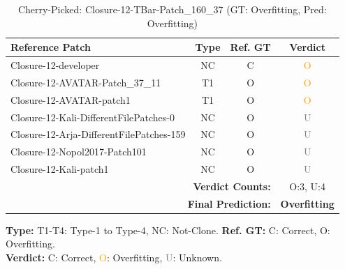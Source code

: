 \begin{table}[t]
\centering
\caption{Cherry-Picked: Closure-12-TBar-Patch\_160\_37 (GT: Overfitting, Pred: Overfitting)}
\label{tab:cherry-Closure12TBarPatch16037}
\footnotesize
\renewcommand{\arraystretch}{1.1}
\setlength{\tabcolsep}{4pt}
\begin{tabular}{l|c|c|c}
\hline
\textbf{Reference Patch} & \textbf{Type} & \textbf{Ref. GT} & \textbf{Verdict} \\
\hline
Closure-12-developer & NC & C & \textcolor{orange}{O} \\
Closure-12-AVATAR-Patch\_37\_11 & T1 & O & \textcolor{orange}{O} \\
Closure-12-AVATAR-patch1 & T1 & O & \textcolor{orange}{O} \\
Closure-12-Kali-DifferentFilePatches-0 & NC & O & \textcolor{gray}{U} \\
Closure-12-Arja-DifferentFilePatches-159 & NC & O & \textcolor{gray}{U} \\
Closure-12-Nopol2017-Patch101 & NC & O & \textcolor{gray}{U} \\
Closure-12-Kali-patch1 & NC & O & \textcolor{gray}{U} \\
\hline
\multicolumn{3}{r|}{\textbf{Verdict Counts:}} & O:3, U:4 \\
\multicolumn{3}{r|}{\textbf{Final Prediction:}} & \textbf{Overfitting} \\
\hline
\end{tabular}
\vspace{1mm}
\parbox{\linewidth}{\centering\footnotesize 
\vspace{1mm}
\textbf{Type:} T1-T4: Type-1 to Type-4, NC: Not-Clone. \;
\textbf{Ref. GT:} C: Correct, O: Overfitting. \\
\textbf{Verdict:} \textcolor{green!60!black}{C}: Correct, \textcolor{orange}{O}: Overfitting, \textcolor{gray}{U}: Unknown.}
\end{table}


